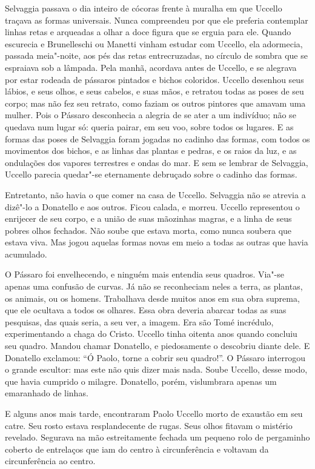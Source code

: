Selvaggia passava o dia inteiro de cócoras frente à muralha em que Uccello
traçava as formas universais. Nunca compreendeu por que ele preferia
contemplar linhas retas e arqueadas a olhar a doce figura que se erguia
para ele. Quando escurecia e Brunelleschi ou Manetti vinham estudar com
Uccello, ela adormecia, passada meia"-noite, aos pés das retas
entrecruzadas, no círculo de sombra que se espraiava sob a lâmpada. Pela
manhã, acordava antes de Uccello, e se alegrava por estar rodeada de
pássaros pintados e bichos coloridos. Uccello desenhou seus lábios, e seus
olhos, e seus cabelos, e suas mãos, e retratou todas as poses de seu
corpo; mas não fez seu retrato, como faziam os outros pintores que amavam
uma mulher. Pois o Pássaro desconhecia a alegria de se ater a um
indivíduo; não se quedava num lugar só: queria pairar, em seu voo, sobre
todos os lugares. E as formas das poses de Selvaggia foram jogadas no
cadinho das formas, com todos os movimentos dos bichos, e as linhas das
plantas e pedras, e os raios da luz, e as ondulações dos vapores
terrestres e ondas do mar. E sem se lembrar de Selvaggia, Uccello parecia
quedar"-se eternamente debruçado sobre o cadinho das formas.

Entretanto, não havia o que comer na casa de Uccello. Selvaggia não se
atrevia a dizê"-lo a Donatello e aos outros. Ficou calada, e morreu.
Uccello representou o enrijecer de seu corpo, e a união de suas mãozinhas
magras, e a linha de seus pobres olhos fechados. Não soube que estava
morta, como nunca soubera que estava viva. Mas jogou aquelas formas novas
em meio a todas as outras que havia acumulado.

O Pássaro foi envelhecendo, e ninguém mais entendia seus quadros. Via"-se
apenas uma confusão de curvas. Já não se reconheciam neles a terra, as
plantas, os animais, ou os homens. Trabalhava desde muitos anos em sua
obra suprema, que ele ocultava a todos os olhares. Essa obra deveria
abarcar todas as suas pesquisas, das quais seria, a seu ver, a imagem. Era
são Tomé incrédulo, experimentando a chaga do Cristo. Uccello tinha
oitenta anos quando concluiu seu quadro. Mandou chamar Donatello, e
piedosamente o descobriu diante dele. E Donatello exclamou: “Ó Paolo,
torne a cobrir seu quadro!”. O Pássaro interrogou o grande escultor: mas
este não quis dizer mais nada. Soube Uccello, desse modo, que havia
cumprido o milagre. Donatello, porém, vislumbrara apenas um emaranhado de
linhas.

E alguns anos mais tarde, encontraram Paolo \mbox{Uccello} morto de exaustão em
seu catre. Seu rosto estava resplandecente de rugas. Seus olhos fitavam o
mistério revelado. Segurava na mão estreitamente fechada um pequeno rolo
de pergaminho coberto de entrelaços que iam do centro à circunferência e
voltavam da circunferência ao centro.

